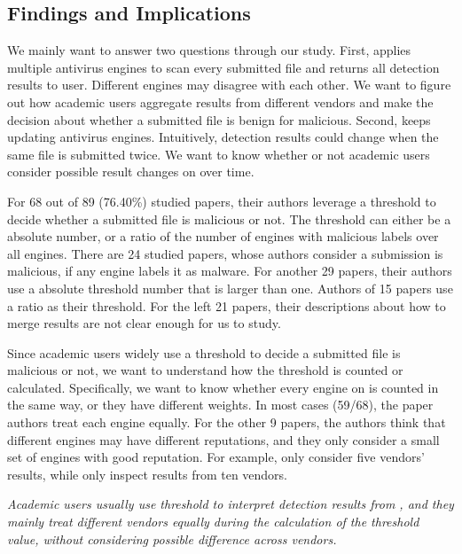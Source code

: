 \subsection{Findings and Implications}
We mainly want to answer two questions through our study.
First, \vt{} applies multiple antivirus engines to scan every submitted file 
and returns all detection results to user.
Different engines may disagree with each other.
We want to figure out how academic users aggregate results from different vendors 
and make the decision about whether a submitted file is benign for malicious. 
Second, \vt{} keeps updating antivirus engines. 
Intuitively, detection results could change when the same file is submitted twice.
We want to know whether or not academic users consider 
possible result changes on \vt{} over time.   


For 68 out of 89 (76.40\%) studied papers, 
their authors leverage a threshold to decide whether a submitted file is 
malicious or not. 
The threshold can either be a absolute number, 
or a ratio of the number of engines with malicious labels over all engines.
There are 24 studied papers, 
whose authors consider a submission is malicious, 
if any engine labels it as malware. 
For another {\color{red} 29} papers, their authors 
use a absolute threshold number that is larger than one. 
Authors of {\color{red} 15} papers use a ratio as their threshold.  
For the left 21 papers, their descriptions about how to merge \vt{} results 
are not clear enough for us to study. 

Since academic users widely use a threshold 
to decide a submitted file is malicious or not, 
we want to understand how the threshold is counted or calculated. 
Specifically, we want to know whether every engine 
on \vt{} is counted in the same way, or they have different weights.   
In most cases (59/68), the paper authors treat each engine equally.
For the other 9 papers, the authors think that different engines 
may have different reputations, 
and they only consider a small set of engines with 
good reputation.
For example, \citet{five-vendors-1} only consider five vendors' results, 
while \citet{arp2014drebin} only inspect results from ten vendors. 

{\it{
Academic users usually use threshold to interpret detection results from \vt{}, 
and they mainly treat different vendors equally during the calculation of the threshold value, 
without considering possible difference across vendors.  
}}



